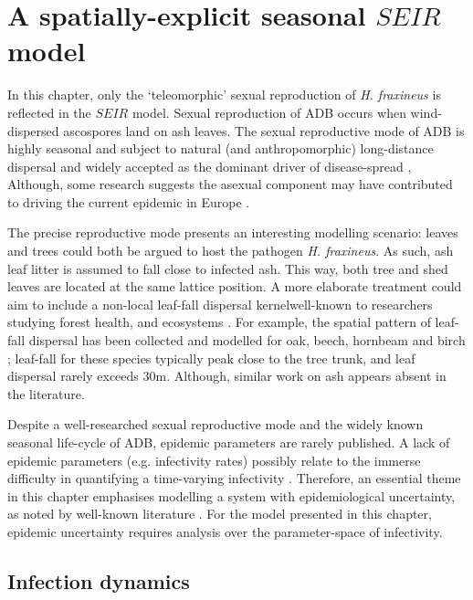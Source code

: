 \section{A spatially-explicit seasonal $SEIR$ model}
\label{sec:seir-model}

In this chapter, only the `teleomorphic' sexual reproduction of \textit{H. fraxineus} is reflected in the $SEIR$ model.
Sexual reproduction of ADB occurs when wind-dispersed ascospores land on ash leaves.
The sexual reproductive mode of ADB is highly seasonal and subject to natural (and anthropomorphic) long-distance dispersal \cite{grosdidier2018tracking} and 
widely accepted as the dominant driver of disease-spread \cite{https://doi.org/10.1111/ppa.12844, havnavckova2017direct, gross2012reproductive, Timmermann2011elal},
Although, some research suggests the asexual component may have contributed to driving the current epidemic in Europe \cite{fones2016role}.

The precise reproductive mode presents an interesting modelling scenario: leaves and trees could both be argued to host the pathogen \textit{H. fraxineus}.
As such, ash leaf litter is assumed to fall close to infected ash.
This way, both tree and shed leaves are located at the same lattice position.
A more elaborate treatment could aim to include a non-local leaf-fall dispersal kernel\textemdash well-known to researchers studying forest health, and ecosystems \cite{staelens2003model}.
For example, the spatial pattern of leaf-fall dispersal has been collected and modelled for oak, beech, hornbeam and birch \cite{nickmans2019modelling};
leaf-fall for these species typically peak close to the tree trunk, and leaf dispersal rarely exceeds $30\mathrm{m}$.
Although, similar work on ash appears absent in the literature.

Despite a well-researched sexual reproductive mode and the widely known seasonal life-cycle of ADB, epidemic parameters are rarely published.
A lack of epidemic parameters (e.g. infectivity rates) possibly relate to the immerse difficulty in quantifying a time-varying infectivity \cite{13-challenges}.
Therefore, an essential theme in this chapter emphasises modelling a system with epidemiological uncertainty, 
as noted by well-known literature \cite{13-challenges, WEBIDEMICS}.
For the model presented in this chapter, epidemic uncertainty requires analysis over the parameter-space of infectivity.

\subsection{Infection dynamics}
\label{sec:infection-dynamics}

